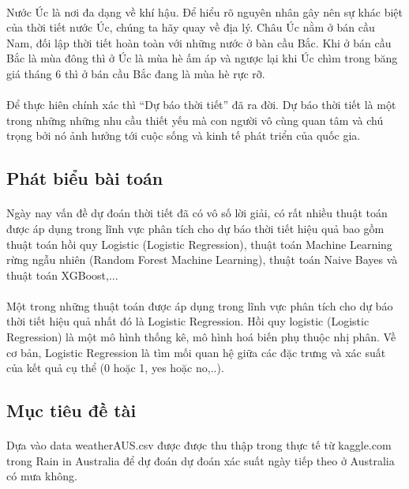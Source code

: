 \documentclass{article}
\begin{document}
\paragraph{}
Nước Úc là nơi đa dạng về khí hậu. Để hiểu rõ nguyên nhân gây nên sự khác biệt của thời tiết nước Úc, chúng ta hãy quay về địa lý. Châu Úc nằm ở bán cầu Nam, đối lập thời tiết hoàn toàn với những nước ở bàn cầu Bắc. Khi ở bán cầu Bắc là mùa đông thì ở Úc là mùa hè ấm áp và ngược lại khi Úc chìm trong băng giá tháng 6 thì ở bán cầu Bắc đang là mùa hè rực rỡ.
\paragraph{}
 Để thực hiên chính xác thì “Dự báo thời tiết” đã ra đời. Dự báo thời tiết là một trong những những nhu cầu thiết yếu mà con người vô cùng quan tâm và chú trọng bởi nó ảnh hưởng tới cuộc sống và kinh tế phát triển của quốc gia.
\subsection{Phát biểu bài toán}
\paragraph{}Ngày nay vấn đề dự đoán thời tiết đã có vô số lời giải, có rất nhiều thuật toán được áp dụng trong lĩnh vực phân tích cho dự báo thời tiết hiệu quả bao gồm thuật toán hồi quy Logistic (Logistic Regression), thuật toán Machine Learning rừng ngẫu nhiên (Random Forest Machine Learning), thuật toán Naive Bayes và thuật toán XGBoost,...
\paragraph{}Một trong những thuật toán được áp dụng trong lĩnh vực phân tích cho dự báo thời tiết hiệu quả nhất đó là Logistic Regression. Hồi quy logistic (Logistic Regression) là một mô hình thống kê, mô hình hoá biến phụ thuộc nhị phân. Về cơ bản, Logistic Regression là tìm mối quan hệ giữa các đặc trưng và xác suất của kết quả cụ thể (0 hoặc 1, yes hoặc no,..).
\paragraph{}
  
\subsection{Mục tiêu đề tài}
\paragraph{}
Dựa vào data weatherAUS.csv được được thu thập trong thực tế  từ kaggle.com trong Rain in Australia để dự đoán dự đoán xác suất ngày tiếp theo ở Australia có mưa không.
	
\end{document}
